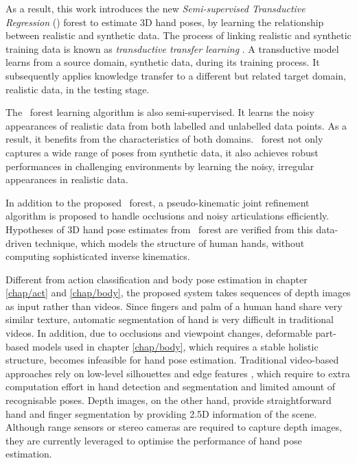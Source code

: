 As a result, this work introduces the new \emph{Semi-supervised Transductive Regression} (\STR) forest to estimate 3D hand poses, by learning the relationship between realistic and synthetic data. 
The process of linking realistic and synthetic training data is known as \emph{transductive transfer learning} \cite{Pan2010}.  
A transductive model learns from a source domain, \eg synthetic data, during its training process.
It subsequently applies knowledge transfer to a different but related target domain, \eg realistic data, in the testing stage. 

The \STR\ forest learning algorithm is also semi-supervised. 
It learns the noisy appearances of realistic data from both labelled and unlabelled data points. 
As a result, it benefits from the characteristics of both domains. 
\STR\ forest not only captures a wide range of poses from synthetic data, it also achieves robust performances in challenging environments by learning the noisy, irregular appearances in realistic data. 

In addition to the proposed \STR\ forest, a pseudo-kinematic joint refinement algorithm is proposed to handle occlusions and noisy articulations efficiently. 
Hypotheses of 3D hand pose estimates from \STR\ forest are verified from this data-driven technique, which models the structure of human hands, without computing sophisticated inverse kinematics. 

Different from action classification and body pose estimation in chapter \ref{chap/act} and \ref{chap/body}, the proposed system takes sequences of depth images as input rather than videos. 
Since fingers and palm of a human hand share very similar texture, automatic segmentation of hand is very difficult in traditional videos. 
In addition, due to occlusions and viewpoint changes, deformable part-based models used in chapter \ref{chap/body}, which requires a stable holistic structure, becomes infeasible for hand pose estimation.   
Traditional video-based approaches rely on low-level silhouettes and edge features \cite{Rosales2001, Chua2002, Athitsos2003, Stenger2006}, which require to extra computation effort in hand detection and segmentation and limited amount of recognisable poses.   
Depth images, on the other hand, provide straightforward hand and finger segmentation by providing 2.5D information of the scene. 
Although range sensors or stereo cameras are required to capture depth images, they are currently leveraged to optimise the performance of hand pose estimation. 

